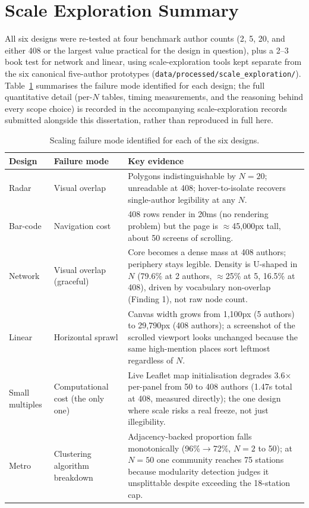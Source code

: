 \documentclass[logo,msc]{infthesis}
\begin{document}
\section{Scale Exploration Summary}
\label{app:scale}

All six designs were re-tested at four benchmark author counts (2, 5, 20, and either 408 or the largest value practical for the design in question), plus a 2--3 book test for network and linear, using scale-exploration tools kept separate from the six canonical five-author prototypes (\texttt{data/processed/scale\_exploration/}). Table~\ref{tab:scale-summary} summarises the failure mode identified for each design; the full quantitative detail (per-$N$ tables, timing measurements, and the reasoning behind every scope choice) is recorded in the accompanying scale-exploration records submitted alongside this dissertation, rather than reproduced in full here.

\begin{table}[h]
\centering
\caption{Scaling failure mode identified for each of the six designs.}
\label{tab:scale-summary}
\small
\begin{tabular}{lp{3.2cm}p{6.8cm}}
\toprule
Design & Failure mode & Key evidence \\
\midrule
Radar & Visual overlap & Polygons indistinguishable by $N{=}20$; unreadable at 408; hover-to-isolate recovers single-author legibility at any $N$. \\
Bar-code & Navigation cost & 408 rows render in 20ms (no rendering problem) but the page is $\approx$45,000px tall, about 50 screens of scrolling. \\
Network & Visual overlap (graceful) & Core becomes a dense mass at 408 authors; periphery stays legible. Density is U-shaped in $N$ (79.6\% at 2 authors, $\approx$25\% at 5, 16.5\% at 408), driven by vocabulary non-overlap (Finding 1), not raw node count. \\
Linear & Horizontal sprawl & Canvas width grows from 1{,}100px (5 authors) to 29{,}790px (408 authors); a screenshot of the scrolled viewport looks unchanged because the same high-mention places sort leftmost regardless of $N$. \\
Small multiples & Computational cost (the only one) & Live Leaflet map initialisation degrades 3.6$\times$ per-panel from 50 to 408 authors (1.47s total at 408, measured directly); the one design where scale risks a real freeze, not just illegibility. \\
Metro & Clustering algorithm breakdown & Adjacency-backed proportion falls monotonically (96\%$\to$72\%, $N{=}2$ to 50); at $N{=}50$ one community reaches 75 stations because modularity detection judges it unsplittable despite exceeding the 18-station cap. \\
\bottomrule
\end{tabular}
\end{table}
\end{document}
